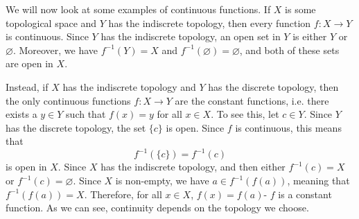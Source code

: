 \documentclass[a4paper, openany]{memoir}
\theoremstyle{definition}
\theoremstyle{plain}
\begin{document}
We will now look at some examples of continuous functions. If $X$ is some topological space and $Y$ has the indiscrete topology, then every function $f: X \to Y$ is continuous. Since $Y$ has the indiscrete topology, an open set in $Y$ is either $Y$ or $\varnothing$. Moreover, we have $f^{-1}(Y) = X$ and $f^{-1}(\varnothing) = \varnothing$, and both of these sets are open in $X$. 

Instead, if $X$ has the indiscrete topology and $Y$ has the discrete topology, then the only continuous functions $f: X \to Y$ are the constant functions, i.e. there exists a $y \in Y$ such that $f(x) = y$ for all $x \in X$. To see this, let $c \in Y$. Since $Y$ has the discrete topology, the set $\{c\}$ is open. Since $f$ is continuous, this means that
\[f^{-1}(\{c\}) = f^{-1}(c)\]
is open in $X$. Since $X$ has the indiscrete topology, and then either $f^{-1}(c) = X$ or $f^{-1}(c) = \varnothing$. Since $X$ is non-empty, we have $a \in f^{-1}(f(a))$, meaning that $f^{-1}(f(a)) = X$. Therefore, for all $x \in X$, $f(x) = f(a)$- $f$ is a constant function. As we can see, continuity depends on the topology we choose.
\end{document}
